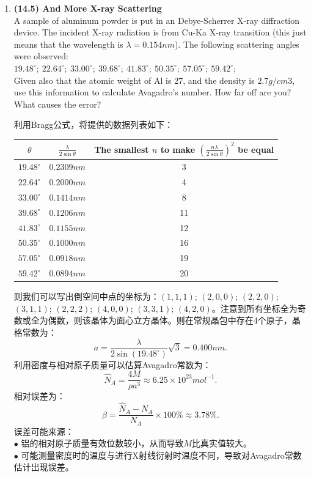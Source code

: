 \documentclass[reqno,a4paper,12pt]{amsart}
\begin{document}
\begin{enumerate}[1.]
\item \textbf{(14.5) And More X-ray Scattering}\\
A sample of aluminum powder is put in an Debye-Scherrer X-ray diffraction device. The incident X-ray radiation is from Cu-Ka X-ray transition (this just means that the wavelength is $\lambda = 0.154nm$). The following scattering angles were observed: \\$19.48^{\circ};~ 22.64^{\circ};~ 33.00^{\circ};~ 39.68^{\circ};~ 41.83^{\circ};~ 50.35^{\circ};~ 57.05^{\circ};~ 59.42^{\circ};$ \\
Given also that the atomic weight of Al is 27, and the density is $2.7g/cm{3}$, use this information to calculate Avagadro's number. How far off are you? What causes the error?

\begin{tcolorbox}[breakable, colback = black!5!white, colframe = black]
利用Bragg公式，将提供的数据列表如下：
\begin{table}[H]
	\centering
	\begin{tabular}{|c|c|c|}
	\hline
	$\theta$ & $\frac{\lambda}{2\sin\theta}$ & The smallest $n$ to make $\left(\frac{n\lambda}{2\sin\theta}\right)^2$ be equal \\ \hline
	$19.48^{\circ}$ & $0.2309nm$ & 3 \\ \hline
	$22.64^{\circ}$ & $0.2000nm$ & 4 \\ \hline
	$33.00^{\circ}$ & $0.1414nm$ & 8 \\ \hline
	$39.68^{\circ}$ & $0.1206nm$ & 11 \\ \hline
	$41.83^{\circ}$ & $0.1155nm$ & 12 \\ \hline
	$50.35^{\circ}$ & $0.1000nm$ & 16 \\ \hline
	$57.05^{\circ}$ & $0.0918nm$ & 19 \\ \hline
	$59.42^{\circ}$ & $0.0894nm$ & 20 \\ \hline
	\end{tabular}
\end{table}
则我们可以写出倒空间中点的坐标为：$(1,1,1)$; $(2,0,0)$; $(2,2,0)$; $(3,1,1)$; $(2,2,2)$; $(4,0,0)$; $(3,3,1)$; $(4,2,0)$。注意到所有坐标全为奇数或全为偶数，则该晶体为面心立方晶体。则在常规晶包中存在4个原子，晶格常数为：
\[
	a = \frac{\lambda}{2\sin(19.48^\circ)} \sqrt{3} = 0.400 nm.
\]
利用密度与相对原子质量可以估算Avagadro常数为：
\[
	\hat{N}_A = \frac{4M}{\rho a^3} \approx 6.25\times 10^{23} mol^{-1}.
\]
相对误差为：
\[
	\beta = \frac{\hat{N}_A - N_A}{N_A} \times 100\% \approx 3.78\%.
\]
误差可能来源： \\
$\bullet$ 铝的相对原子质量有效位数较小，从而导致$M$比真实值较大。 \\
$\bullet$ 可能测量密度时的温度与进行X射线衍射时温度不同，导致对Avagadro常数估计出现误差。
\end{tcolorbox}


\end{enumerate}
\end{document}
